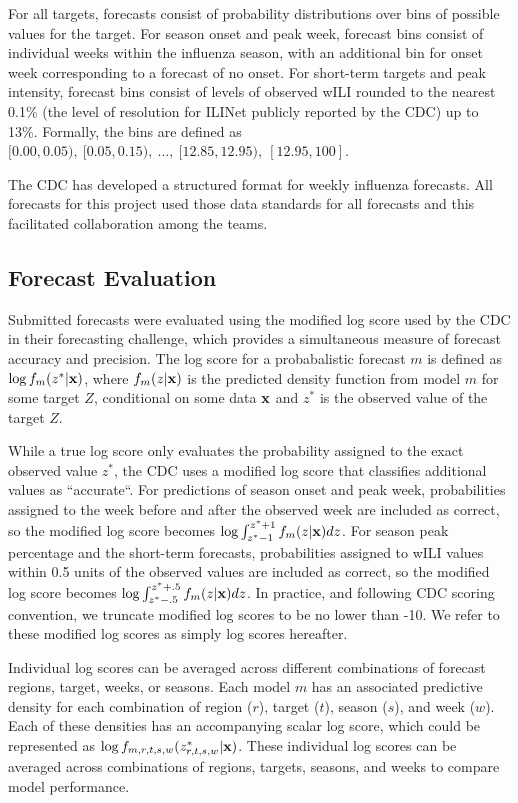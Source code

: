 \documentclass{article}\usepackage[]{graphicx}\usepackage[]{color}
\begin{document}
For all targets, forecasts consist of probability distributions over bins of possible values for the target. For season onset and peak week, forecast bins consist of individual weeks within the influenza season, with an additional bin for onset week corresponding to a forecast of no onset. For short-term targets and peak intensity, forecast bins consist of levels of observed wILI rounded to the nearest 0.1\% (the level of resolution for ILINet publicly reported by the CDC) up to 13\%. Formally, the bins are defined as $[0.00, 0.05),\ [0.05, 0.15),\ \dots,\ [12.85, 12.95),\ [12.95, 100]$. 

The CDC has developed a structured format for weekly influenza forecasts. All forecasts for this project used those data standards for all forecasts and this facilitated collaboration among the teams.

\subsection{Forecast Evaluation}
Submitted forecasts were evaluated using the modified log score used by the CDC in their forecasting challenge, which provides a simultaneous measure of forecast accuracy and precision. The log score for a probabalistic forecast $m$ is defined as $\log f_m(z^*|\bf{x})$, where $f_m(z|\bf{x})$ is the predicted density function from model $m$ for some target $Z$, conditional on some data $\bf{x}$ and $z^*$ is the observed value of the target $Z$. 

While a true log score only evaluates the probability assigned to the exact observed value $z^*$, the CDC uses a modified log score that classifies additional values as ``accurate``. For predictions of season onset and peak week, probabilities assigned to the week before and after the observed week are included as correct, so the modified log score becomes $\log \int_{z^* -1}^{z^* + 1} f_m(z|{\bf{x}})dz$. For season peak percentage and the short-term forecasts, probabilities assigned to wILI values within 0.5 units of the observed values are included as correct, so the modified log score becomes $\log \int_{z^* -.5}^{z^* + .5} f_m(z|{\bf{x}})dz$. In practice, and following CDC scoring convention, we truncate modified log scores to be no lower than -10. We refer to these modified log scores as simply log scores hereafter.

Individual log scores can be averaged across different combinations of forecast regions, target, weeks, or seasons. Each model $m$ has an associated predictive density for each combination of region ($r$), target ($t$), season ($s$), and week ($w$). Each of these densities has an accompanying scalar log score, which could be represented as $\log f_{m,r,t,s,w}(z^*_{r,t,s,w}|\bf{x})$. These individual log scores can be averaged across combinations of regions, targets, seasons, and weeks to compare model performance.
\end{document}
